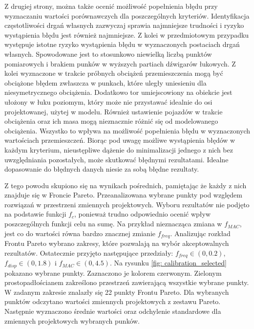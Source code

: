 Z drugiej strony, można także ocenić możliwość popełnienia błędu przy wyznaczaniu wartości porównawczych dla poszczególnych kryteriów. Identyfikacja częstotliwości drgań własnych zazwyczaj sprawia najmniejsze trudności i ryzyko wystąpienia błędu jest również najmniejsze. Z kolei w przedmiotowym przypadku występuje istotne ryzyko wystąpienia błędu w wyznaczonych postaciach drgań własnych. Spowodowane jest to stosunkowo niewielką liczbą punktów pomiarowych i brakiem punków w wyższych partiach dźwigarów łukowych. Z kolei wyznaczone w trakcie próbnych obciążeń przemieszczenia mogą być obciążone błędem zwłaszcza w punkach, które uległy uniesieniu dla niesymetrycznego obciążenia. Dodatkowo tor umiejscowiony na obiekcie jest ułożony w łuku poziomym, który może nie przystawać idealnie do osi projektowanej, użytej w modelu. Również ustawienie pojazdów w trakcie obciążenia oraz ich masa mogą nieznacznie różnić się od modelowanego obciążenia. Wszystko to wpływa na możliwość popełnienia błędu w wyznaczonych wartościach przemieszczeń. Biorąc pod uwagę możliwe wystąpienia błędów w każdym kryterium, nieustępliwe dążenie do minimalizacji jednego z nich bez uwzględniania pozostałych, może skutkować błędnymi rezultatami. Idealne dopasowanie do błędnych danych niesie za sobą błędne rezultaty.

Z tego powodu skupiono się na wynikach pośrednich, pamiętając że każdy z nich znajduje się w Froncie Pareto. Przeanalizowana wybrane punkty pod względem rozwiązań w przestrzeni zmiennych projektowych. Wyboru rezultatów nie podjęto na podstawie funkcji $f_c$, ponieważ trudno odpowiednio ocenić wpływ poszczególnych funkcji celu na sumę. Na przykład nieznacząca zmiana w $f_{MAC}$, jest co do wartości równa bardzo znacznej zmianie $f_{freq}$. Analizując rozkład Frontu Pareto wybrano zakresy, które pozwalają na wybór akceptowalnych rezultatów. Ostatecznie przyjęto następujące przedziały: $f_{freq} \in (0,0.2)$, $f_{disp} \in (0,1.8)$ i $f_{MAC} \in (0,4.5)$. Na rysunku \ref{fig: calibration_selected} pokazano wybrane punkty. Zaznaczono je kolorem czerwonym. Zielonym prostopadłościanem zakreślono przestrzeń zawierającą wszystkie wybrane punkty. W zadanym zakresie znalazły się 22 punkty Frontu Pareto. Dla wybranych punktów odczytano wartości zmiennych projektowych z zestawu Pareto. Następnie wyznaczono średnie wartości oraz odchylenie standardowe dla zmiennych projektowych wybranych punków. 

